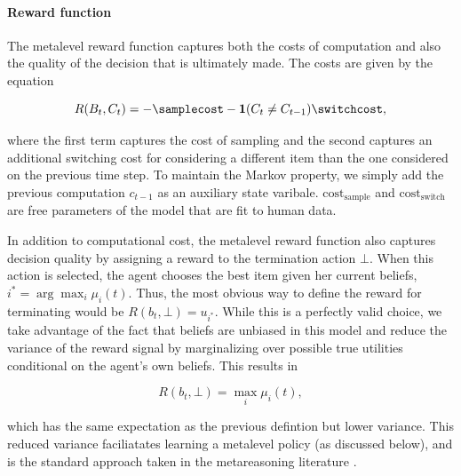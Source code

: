 \documentclass[12pt,a4paperpaper,]{article}
\begin{document}
\paragraph{Reward function}
The metalevel reward function captures both the costs of computation and also the quality of the decision that is ultimately made. The costs are given by the equation

\begin{equation}
R(B_t, C_t) = -\samplecost - \mathbf{1}(C_t \neq C_{t-1}) \switchcost
,
\end{equation}

where the first term captures the cost of sampling and the second captures an additional switching cost for considering a different item than the one considered on the previous time step. To maintain the Markov property, we simply add the previous computation $c_{t-1}$ as an auxiliary state varibale. ${\text{cost}_\text{sample}}$ and ${\text{cost}_\text{switch}}$ are free parameters of the model that are fit to human data.

In addition to computational cost, the metalevel reward function also captures decision quality by assigning a reward to the termination action $\bot$. When this action is selected, the agent chooses the best item given her current beliefs, $i^* = \arg\max_i \mu_i(t)$. Thus, the most obvious way to define the reward for terminating would be $R(b_t, \bot) = u_{i^*}$. While this is a perfectly valid choice, we take advantage of the fact that beliefs are unbiased in this model and reduce the variance of the reward signal by marginalizing over possible true utilities conditional on the agent's own beliefs. This results in

\begin{equation}
R(b_t, \bot) = \max_i \mu_i(t)
, 
\end{equation}

which has the same expectation as the previous defintion but lower variance. This reduced variance faciliatates learning a metalevel policy (as discussed below), and is the standard approach taken in the metareasoning literature \citep{Hay2012}.
\end{document}
